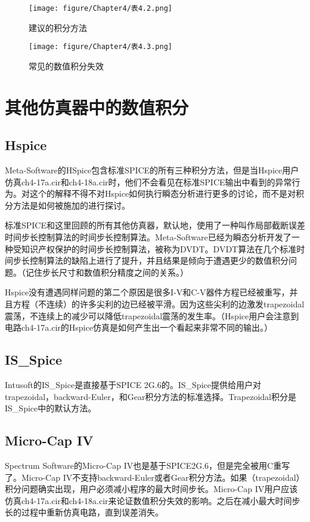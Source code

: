 \begin{figure}[htbp]
\small
    \centering
    \texttt{[image: figure/Chapter4/表4.2.png]}
    \caption{建议的积分方法}
    \label{表4.2}
\end{figure}

\begin{figure}[htbp]
\small
    \centering
    \texttt{[image: figure/Chapter4/表4.3.png]}
    \caption{常见的数值积分失效}
    \label{表4.3}
\end{figure}

\section{其他仿真器中的数值积分}
\subsection{Hspice}
Meta-Software的HSpice包含标准SPICE的所有三种积分方法，但是当Hspice用户仿真ch4-17a.cir和ch4-18a.cir时，他们不会看见在标准SPICE输出中看到的异常行为。对这个的解释不得不对Hspice如何执行瞬态分析进行更多的讨论，而不是对积分方法是如何被施加的进行探讨\cite{chap4-7}。

标准SPICE和这里回顾的所有其他仿真器，默认地，使用了一种叫作局部截断误差时间步长控制算法的时间步长控制算法。Meta-Software已经为瞬态分析开发了一种受知识产权保护的时间步长控制算法，被称为DVDT。DVDT算法在几个标准时间步长控制算法的缺陷上进行了提升，并且结果是倾向于遭遇更少的数值积分问题。（记住步长尺寸和数值积分精度之间的关系。）

Hspice没有遭遇同样问题的第二个原因是很多I-V和C-V器件方程已经被重写，并且方程（不连续）的许多尖利的边已经被平滑。因为这些尖利的边激发trapezoidal震荡，不连续上的减少可以降低trapezoidal震荡的发生率。（Hspice用户会注意到电路ch4-17a.cir的Hspice仿真是如何产生出一个看起来非常不同的输出。）

\subsection{IS\_{Spice}}
Intusoft的IS\_{Spice}是直接基于SPICE 2G.6的。IS\_{Spice}提供给用户对trapezoidal，backward-Euler，和Gear积分方法的标准选择。Trapezoidal积分是IS\_{Spice}中的默认方法。

\subsection{Micro-Cap IV}
Spectrum Software的Micro-Cap IV也是基于SPICE2G.6，但是完全被用C重写了。Micro-Cap IV不支持backward-Euler或者Gear积分方法\cite{chap4-9}。如果（trapezoidal）积分问题确实出现，用户必须减小程序的最大时间步长。Micro-Cap IV用户应该仿真ch4-17a.cir和ch4-18a.cir来论证数值积分失效的影响。之后在减小最大时间步长的过程中重新仿真电路，直到误差消失。

